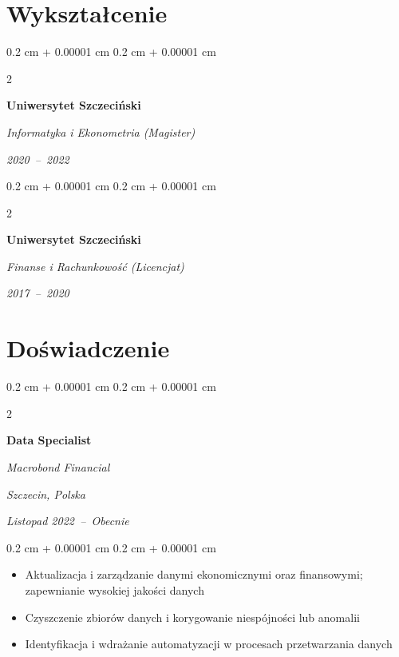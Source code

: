 \documentclass[10pt, letterpaper]{article}
\newenvironment{highlights}{
    \begin{itemize}[
        topsep=0.10 cm,
        parsep=0.10 cm,
        partopsep=0pt,
        itemsep=0pt,
        leftmargin=0.4 cm + 10pt
    ]
}{
    \end{itemize}
} %
\newenvironment{onecolentry}{
    \begin{adjustwidth}{
        0.2 cm + 0.00001 cm
    }{
        0.2 cm + 0.00001 cm
    }
}{
    \end{adjustwidth}
} %
\newenvironment{twocolentry}[2][]{
    \onecolentry
    \def\secondColumn{#2}
    \setcolumnwidth{\fill, 4.5 cm}
    \begin{paracol}{2}
}{
    \switchcolumn \raggedleft \secondColumn
    \end{paracol}
    \endonecolentry
} %
\begin{document}
      \section{Wykształcenie}



        
      
      \begin{twocolentry}{
          \textit{2020~–~2022}
      }
          \textbf{Uniwersytet Szczeciński}
      
          \textit{Informatyka i Ekonometria (Magister)}
      \end{twocolentry}
      \vspace{0.15 cm}
      
      \begin{twocolentry}{
          \textit{2017~–~2020}
      }
          \textbf{Uniwersytet Szczeciński}
      
          \textit{Finanse i Rachunkowość (Licencjat)}
      \end{twocolentry}
      \vspace{0.15 cm}
      



    
      \section{Doświadczenie}



        
      
      \begin{twocolentry}{
          \textit{Szczecin, Polska}
      
          \textit{Listopad 2022~–~Obecnie}
      }
          \textbf{Data Specialist}
      
          \textit{Macrobond Financial}
      \end{twocolentry}
      
      \vspace{0.10 cm}
      \begin{onecolentry}
          \begin{highlights}
              
              \item Aktualizacja i zarządzanie danymi ekonomicznymi oraz finansowymi; zapewnianie wysokiej jakości danych
              
              \item Czyszczenie zbiorów danych i korygowanie niespójności lub anomalii
              
              \item Identyfikacja i wdrażanie automatyzacji w procesach przetwarzania danych
              
          \end{highlights}
      \end{onecolentry}
      
\end{document}
